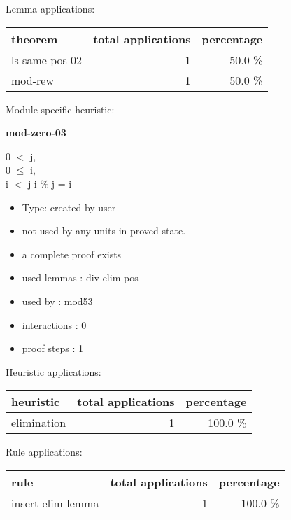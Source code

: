 \documentclass[a4paper]{article}
\begin{document}
Lemma applications:

\begin{supertabular}{l|r|r}
theorem	        & total applications & percentage \\ \hline
ls-same-pos-02 & 1 & 50.0 \% \\
mod-rew & 1 & 50.0 \% \\

\end{supertabular}

Module specific heuristic:

\pagebreak

{\LARGE\bf mod-zero-03}\label{lemma-mod-zero-03}

\medskip

0 $<$ j, \\
0 $\le$ i, \\
i $<$ j \Fol i \% j = i

\begin{itemize}

\item Type: created by user

\item not used by any units in proved state.
\item       a complete proof exists
\item       used lemmas  : div-elim-pos
\item       used by      : mod53
\item       interactions : 0
\item       proof steps  : 1
\end{itemize}

\medskip


Heuristic applications:

\begin{supertabular}{l|r|r}
heuristic	& total applications & percentage \\ \hline
elimination & 1 & 100.0 \% \\

\end{supertabular}

Rule applications:

\begin{supertabular}{l|r|r}
rule	        & total applications & percentage \\ \hline
insert elim lemma & 1 & 100.0 \% \\

\end{supertabular}
\end{document}
